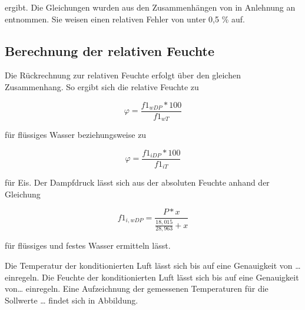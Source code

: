 ergibt. Die Gleichungen wurden aus den Zusammenhängen von \cite{.b} in Anlehnung an \cite{Buck.1981} entnommen. Sie weisen einen relativen Fehler von unter 0,5 \% auf.

\subsection{Berechnung der relativen Feuchte}
Die Rückrechnung zur relativen Feuchte erfolgt über den gleichen Zusammenhang. So ergibt sich die relative Feuchte zu

\begin{equation}
\varphi=\frac{f1_{wDP}*100}{f1_{wT}} 
\end{equation}

für flüssiges Wasser beziehungsweise zu 

\begin{equation}
\varphi=\frac{f1_{iDP}*100}{f1_{iT}} 
\end{equation}

für Eis. Der Dampfdruck lässt sich aus der absoluten Feuchte anhand der Gleichung

\begin{equation}
f1_{i,wDP}=\frac{P*x}{\frac{18,015}{28,963}+x} 
\end{equation}

für flüssiges und festes Wasser ermitteln lässt.


Die Temperatur der konditionierten Luft lässt sich bis auf eine Genauigkeit von … einregeln. Die Feuchte der konditionierten Luft lässt sich bis auf eine Genauigkeit von… einregeln. Eine Aufzeichnung der gemessenen Temperaturen für die Sollwerte … findet sich in Abbildung.

